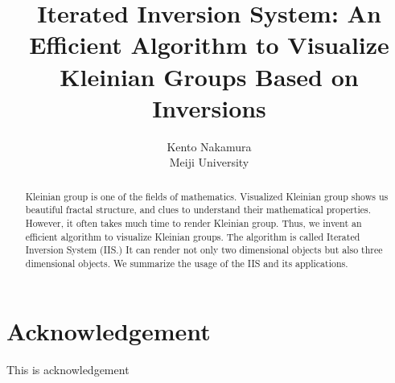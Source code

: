 \documentclass[uplatex, dvipdfmx]{article}
\title{ Iterated Inversion System: An Efficient Algorithm to Visualize Kleinian Groups Based on Inversions }
\author{ Kento Nakamura\\
Meiji University\\
}
\date{}
\begin{document}
\maketitle

\begin{abstract}
 Kleinian group is one of the fields of mathematics. Visualized
 Kleinian group shows us beautiful fractal structure, and clues to
 understand their mathematical properties.
 However, it often takes much time to render Kleinian group.
 Thus, we invent an efficient algorithm to visualize Kleinian groups. 
 The algorithm is called Iterated Inversion System
 (IIS.) It can render not only two dimensional objects but also three
 dimensional objects.
 We summarize the usage of the IIS and its applications.
\end{abstract}

\clearpage

\tableofcontents

\clearpage

\section*{Acknowledgement}
This is acknowledgement









\printbibliography
\end{document}
